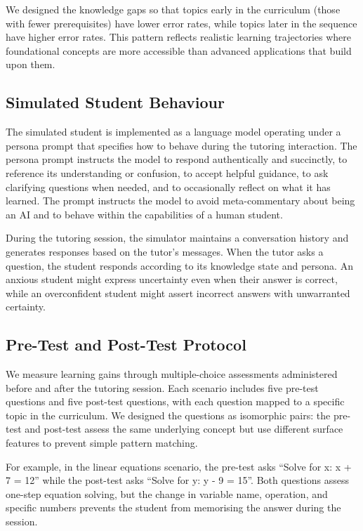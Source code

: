 \documentclass[logo,bsc,singlespacing,parskip,online]{infthesis}
\begin{document}
We designed the knowledge gaps so that topics early in the curriculum (those with fewer prerequisites) have lower error rates, while topics later in the sequence have higher error rates. This pattern reflects realistic learning trajectories where foundational concepts are more accessible than advanced applications that build upon them.

\subsection{Simulated Student Behaviour}

The simulated student is implemented as a language model operating under a persona prompt that specifies how to behave during the tutoring interaction. The persona prompt instructs the model to respond authentically and succinctly, to reference its understanding or confusion, to accept helpful guidance, to ask clarifying questions when needed, and to occasionally reflect on what it has learned. The prompt instructs the model to avoid meta-commentary about being an AI and to behave within the capabilities of a human student.

During the tutoring session, the simulator maintains a conversation history and generates responses based on the tutor's messages. When the tutor asks a question, the student responds according to its knowledge state and persona. An anxious student might express uncertainty even when their answer is correct, while an overconfident student might assert incorrect answers with unwarranted certainty.

\subsection{Pre-Test and Post-Test Protocol}

We measure learning gains through multiple-choice assessments administered before and after the tutoring session. Each scenario includes five pre-test questions and five post-test questions, with each question mapped to a specific topic in the curriculum. We designed the questions as isomorphic pairs: the pre-test and post-test assess the same underlying concept but use different surface features to prevent simple pattern matching.

For example, in the linear equations scenario, the pre-test asks ``Solve for x: x + 7 = 12'' while the post-test asks ``Solve for y: y - 9 = 15''. Both questions assess one-step equation solving, but the change in variable name, operation, and specific numbers prevents the student from memorising the answer during the session.
\end{document}
